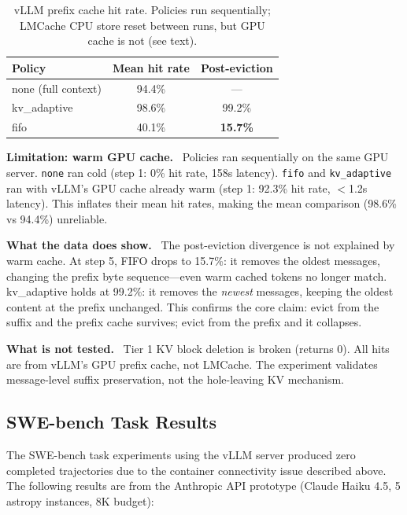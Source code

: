\documentclass[letterpaper,twocolumn,10pt]{article}
\newcommand{\para}[1]{\smallskip\noindent\textbf{#1.}\ }
\begin{document}
\begin{table}[h]
\centering\small
\begin{tabular}{lcc}
\toprule
\textbf{Policy} & \textbf{Mean hit rate} & \textbf{Post-eviction} \\
\midrule
none (full context) & 94.4\% & --- \\
kv\_adaptive        & 98.6\% & 99.2\% \\
fifo                & 40.1\% & \textbf{15.7\%} \\
\bottomrule
\end{tabular}
\caption{vLLM prefix cache hit rate. Policies run sequentially; LMCache CPU
store reset between runs, but GPU cache is not (see text).}
\label{tab:hitrate}
\end{table}

\para{Limitation: warm GPU cache} Policies ran sequentially on the same GPU
server. \texttt{none} ran cold (step 1: 0\% hit rate, 158s latency).
\texttt{fifo} and \texttt{kv\_adaptive} ran with vLLM's GPU cache already
warm (step 1: 92.3\% hit rate, $<$1.2s latency). This inflates their mean
hit rates, making the mean comparison (98.6\% vs 94.4\%) unreliable.

\para{What the data does show} The post-eviction divergence is not explained
by warm cache. At step 5, FIFO drops to 15.7\%: it removes the oldest
messages, changing the prefix byte sequence---even warm cached tokens no
longer match. kv\_adaptive holds at 99.2\%: it removes the \emph{newest}
messages, keeping the oldest content at the prefix unchanged. This confirms
the core claim: evict from the suffix and the prefix cache survives; evict
from the prefix and it collapses.

\para{What is not tested} Tier 1 KV block deletion is broken (returns 0).
All hits are from vLLM's GPU prefix cache, not LMCache. The experiment
validates message-level suffix preservation, not the hole-leaving KV
mechanism.

\subsection{SWE-bench Task Results}

The SWE-bench task experiments using the vLLM server produced zero completed
trajectories due to the container connectivity issue described above. The
following results are from the Anthropic API prototype (Claude Haiku 4.5,
5 astropy instances, 8K budget):
\end{document}
